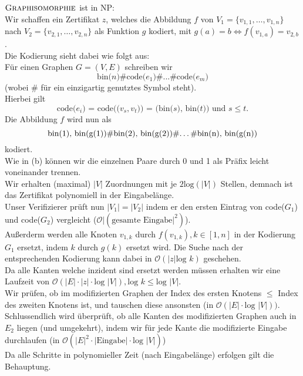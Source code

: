 \begin{enumerate}[(a)]
	$\textsc{Graphisomorphie}$ ist in NP:\\
	Wir schaffen ein Zertifikat $z$, welches die Abbildung $f$ von $V_1 = \{ v_{1,1}, \dots, v_{1,n} \}$ nach $V_2 = \{ v_{2,1}, \dots, v_{2,n} \}$ als Funktion $g$ kodiert, mit $g(a)=b \Leftrightarrow f(v_{1,a})=v_{2,b}$.\\
	Die Kodierung sieht dabei wie folgt aus:\\
	Für einen Graphen $G=(V,E)$ schreiben wir $$\text{bin($n$)\#code($e_1$)\#...\#code($e_m$)}$$ (wobei \# für ein einzigartig genutztes Symbol steht).\\
	Hierbei gilt $$\text{code($e_i$) = code(($v_s, v_t$)) = (bin($s$), bin($t$)) und $s \leq t$}.$$
	Die Abbildung $f$ wird nun als $$\text{bin(1), bin(g(1))\#bin(2), bin(g(2))\#\dots\#bin(n), bin(g(n))}$$
	kodiert.\\
	Wie in (b) können wir die einzelnen Paare durch 0 und 1 als Präfix leicht voneinander trennen. \\
	Wir erhalten (maximal) $|V|$ Zuordnungen mit je $2\text{log}(|V|)$ Stellen, demnach ist das Zertifikat polynomiell in der Eingabelänge.\\
	Unser Verifizierer prüft nun $|V_1|=|V_2|$ indem er den ersten Eintrag von code($G_1$) und code($G_2$) vergleicht ($\mathcal{O}|(\text{gesamte Eingabe}|^2)$).\\
	Außerderm werden alle Knoten $v_{1,k}$ durch $f(v_{1,k}), k \in [1,n]$ in der Kodierung $G_1$ ersetzt, indem $k$ durch $g(k)$ ersetzt wird. Die Suche nach der entsprechenden Kodierung kann dabei in $\mathcal{O}(|z|\text{log } k)$ geschehen.\\
	Da alle Kanten welche inzident sind ersetzt werden müssen erhalten wir eine Laufzeit von $\mathcal{O}(|E|\cdot|z|\cdot\text{log }|V|), \text{log }k \leq \text{log }|V|$.\\
	Wir prüfen, ob im modifizierten Graphen der Index des ersten Knotens $\leq$ Index des zweiten Knotens ist, und tauschen diese ansonsten (in $\mathcal{O}(|E|\cdot \text{log } |V|))$.\\
	Schlussendlich wird überprüft, ob alle Kanten des modifizierten Graphen auch in $E_2$ liegen (und umgekehrt), indem wir für jede Kante die modifizierte Eingabe durchlaufen (in $\mathcal{O}(|E|^2\cdot| \text{Eingabe}|\cdot \text{log }|V|)$)\\
	Da alle Schritte in polynomieller Zeit (nach Eingabelänge) erfolgen gilt die Behauptung.
	
\newpage
	
\end{enumerate}
